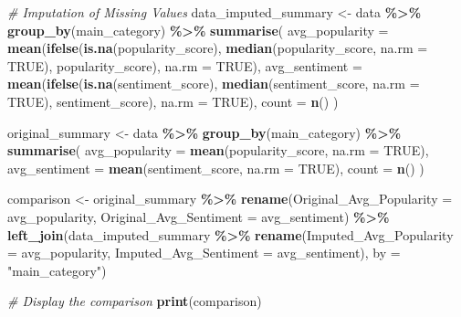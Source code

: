 \documentclass[
]{article}
\newenvironment{Shaded}{\begin{snugshade}}{\end{snugshade}}
\newcommand{\AttributeTok}[1]{\textcolor[rgb]{0.13,0.29,0.53}{#1}}
\newcommand{\CommentTok}[1]{\textcolor[rgb]{0.56,0.35,0.01}{\textit{#1}}}
\newcommand{\ConstantTok}[1]{\textcolor[rgb]{0.56,0.35,0.01}{#1}}
\newcommand{\FunctionTok}[1]{\textcolor[rgb]{0.13,0.29,0.53}{\textbf{#1}}}
\newcommand{\NormalTok}[1]{#1}
\newcommand{\OtherTok}[1]{\textcolor[rgb]{0.56,0.35,0.01}{#1}}
\newcommand{\SpecialCharTok}[1]{\textcolor[rgb]{0.81,0.36,0.00}{\textbf{#1}}}
\newcommand{\StringTok}[1]{\textcolor[rgb]{0.31,0.60,0.02}{#1}}
\begin{document}
\begin{Shaded}
\begin{Highlighting}[]
\CommentTok{\# Imputation of Missing Values}
\NormalTok{data\_imputed\_summary }\OtherTok{\textless{}{-}}\NormalTok{ data }\SpecialCharTok{\%\textgreater{}\%}
  \FunctionTok{group\_by}\NormalTok{(main\_category) }\SpecialCharTok{\%\textgreater{}\%}
  \FunctionTok{summarise}\NormalTok{(}
    \AttributeTok{avg\_popularity =} \FunctionTok{mean}\NormalTok{(}\FunctionTok{ifelse}\NormalTok{(}\FunctionTok{is.na}\NormalTok{(popularity\_score), }\FunctionTok{median}\NormalTok{(popularity\_score, }\AttributeTok{na.rm =} \ConstantTok{TRUE}\NormalTok{), popularity\_score), }\AttributeTok{na.rm =} \ConstantTok{TRUE}\NormalTok{),}
    \AttributeTok{avg\_sentiment =} \FunctionTok{mean}\NormalTok{(}\FunctionTok{ifelse}\NormalTok{(}\FunctionTok{is.na}\NormalTok{(sentiment\_score), }\FunctionTok{median}\NormalTok{(sentiment\_score, }\AttributeTok{na.rm =} \ConstantTok{TRUE}\NormalTok{), sentiment\_score), }\AttributeTok{na.rm =} \ConstantTok{TRUE}\NormalTok{),}
    \AttributeTok{count =} \FunctionTok{n}\NormalTok{()}
\NormalTok{  )}

\NormalTok{original\_summary }\OtherTok{\textless{}{-}}\NormalTok{ data }\SpecialCharTok{\%\textgreater{}\%}
  \FunctionTok{group\_by}\NormalTok{(main\_category) }\SpecialCharTok{\%\textgreater{}\%}
  \FunctionTok{summarise}\NormalTok{(}
    \AttributeTok{avg\_popularity =} \FunctionTok{mean}\NormalTok{(popularity\_score, }\AttributeTok{na.rm =} \ConstantTok{TRUE}\NormalTok{),}
    \AttributeTok{avg\_sentiment =} \FunctionTok{mean}\NormalTok{(sentiment\_score, }\AttributeTok{na.rm =} \ConstantTok{TRUE}\NormalTok{),}
    \AttributeTok{count =} \FunctionTok{n}\NormalTok{()}
\NormalTok{  )}

\NormalTok{comparison }\OtherTok{\textless{}{-}}\NormalTok{ original\_summary }\SpecialCharTok{\%\textgreater{}\%}
  \FunctionTok{rename}\NormalTok{(}\AttributeTok{Original\_Avg\_Popularity =}\NormalTok{ avg\_popularity, }\AttributeTok{Original\_Avg\_Sentiment =}\NormalTok{ avg\_sentiment) }\SpecialCharTok{\%\textgreater{}\%}
  \FunctionTok{left\_join}\NormalTok{(data\_imputed\_summary }\SpecialCharTok{\%\textgreater{}\%} \FunctionTok{rename}\NormalTok{(}\AttributeTok{Imputed\_Avg\_Popularity =}\NormalTok{ avg\_popularity, }\AttributeTok{Imputed\_Avg\_Sentiment =}\NormalTok{ avg\_sentiment),}
            \AttributeTok{by =} \StringTok{"main\_category"}\NormalTok{)}

\CommentTok{\# Display the comparison}
\FunctionTok{print}\NormalTok{(comparison)}
\end{Highlighting}
\end{Shaded}
\end{document}
